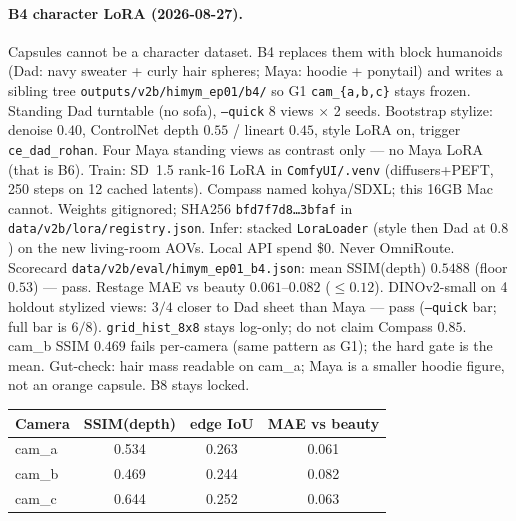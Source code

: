 \documentclass[10pt,twocolumn,letterpaper]{article}
\begin{document}
\paragraph{B4 character LoRA (2026-08-27).}
Capsules cannot be a character dataset. B4 replaces them with block humanoids (Dad: navy sweater + curly hair spheres; Maya: hoodie + ponytail) and writes a sibling tree \texttt{outputs/v2b/himym\_ep01/b4/} so G1 \texttt{cam\_\{a,b,c\}} stays frozen.
Standing Dad turntable (no sofa), \texttt{--quick} 8 views $\times$ 2 seeds. Bootstrap stylize: denoise $0.40$, ControlNet depth $0.55$ / lineart $0.45$, style LoRA on, trigger \texttt{ce\_dad\_rohan}. Four Maya standing views as contrast only --- no Maya LoRA (that is B6).
Train: SD~1.5 rank-16 LoRA in \texttt{ComfyUI/.venv} (diffusers+PEFT, 250 steps on 12 cached latents). Compass named kohya/SDXL; this 16GB Mac cannot. Weights gitignored; SHA256 \texttt{bfd7f7d8\ldots 3bfaf} in \texttt{data/v2b/lora/registry.json}.
Infer: stacked \texttt{LoraLoader} (style then Dad at $0.8$) on the new living-room AOVs. Local API spend \$0. Never OmniRoute.
Scorecard \texttt{data/v2b/eval/himym\_ep01\_b4.json}: mean SSIM(depth) $0.5488$ (floor $0.53$) --- pass. Restage MAE vs beauty $0.061$--$0.082$ ($\le 0.12$). DINOv2-small on 4 holdout stylized views: $3/4$ closer to Dad sheet than Maya --- pass (\texttt{--quick} bar; full bar is $6/8$). \texttt{grid\_hist\_8x8} stays log-only; do not claim Compass $0.85$.
cam\_b SSIM $0.469$ fails per-camera (same pattern as G1); the hard gate is the mean. Gut-check: hair mass readable on cam\_a; Maya is a smaller hoodie figure, not an orange capsule. B8 stays locked.

\begin{center}
\small
\begin{tabular}{lccc}
\toprule
Camera & SSIM(depth) & edge IoU & MAE vs beauty \\
\midrule
cam\_a & 0.534 & 0.263 & 0.061 \\
cam\_b & 0.469 & 0.244 & 0.082 \\
cam\_c & 0.644 & 0.252 & 0.063 \\
\bottomrule
\end{tabular}
\end{center}
\end{document}
